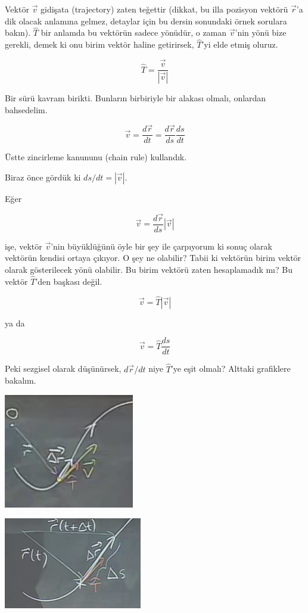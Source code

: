 \documentclass[12pt,fleqn]{article}\usepackage{../../common}
\begin{document}
Vektör $\vec{v}$ gidişata (trajectory) zaten teğettir (dikkat, bu illa pozisyon
vektörü $\vec{r}$'a dik olacak anlamına gelmez, detaylar için bu dersin
sonundaki örnek sorulara bakın). $\hat{T}$ bir anlamda bu vektörün sadece
yönüdür, o zaman $\vec{v}$'nin yönü bize gerekli, demek ki onu birim vektör
haline getirirsek, $\hat{T}$'yi elde etmiş oluruz.

$$ \hat{T} = \frac{\vec{v}}{|\vec{v}|} $$

Bir sürü kavram birikti. Bunların birbiriyle bir alakası olmalı, onlardan
bahsedelim. 

$$ \vec{v} = \frac{d\vec{r}}{dt} = \frac{d\vec{r}}{ds}\frac{ds}{dt} $$

Üstte zincirleme kanununu (chain rule) kullandık. 

Biraz önce gördük ki $ds/dt = |\vec{v}|$. 

Eğer 

$$ \vec{v} = \frac{d\vec{r}}{ds}|\vec{v}| $$

işe, vektör $\vec{v}$'nin büyüklüğünü öyle bir şey ile çarpıyorum ki sonuç
olarak vektörün kendisi ortaya çıkıyor. O şey ne olabilir? Tabii ki
vektörün birim vektör olarak gösterilecek yönü olabilir. Bu birim vektörü
zaten hesaplamadık mı? Bu vektör $\hat{T}$'den başkası değil.

$$ \vec{v} = \hat{T}|\vec{v}| $$

ya da

$$ \vec{v} = \hat{T}\frac{ds}{dt} $$

Peki sezgisel olarak düşünürsek, $d\vec{r}/dt$ niye $\hat{T}$'ye eşit olmalı?
Alttaki grafiklere bakalım.

\begin{center}
\includegraphics[height=5cm]{6_4.png}
\end{center}

\begin{center}
\includegraphics[height=4cm]{6_5.png}
\end{center}
\end{document}
